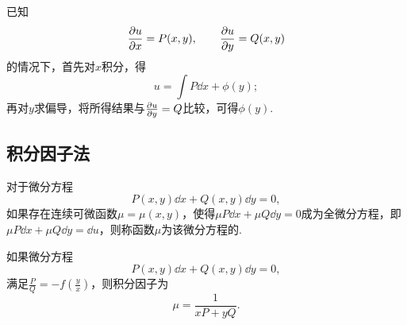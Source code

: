已知\[
\pdv{u}{x} = P(x,y),
\qquad
\pdv{u}{y} = Q(x,y)
\]的情况下，首先对\(x\)积分，得\[
u = \int P \dd{x} + \phi(y);
\]再对\(y\)求偏导，将所得结果与\(\pdv{u}{y} = Q\)比较，可得\(\phi(y)\).

\subsection{积分因子法}
对于微分方程\[
P(x,y)\dd{x} + Q(x,y)\dd{y} = 0,
\]如果存在连续可微函数\(\mu=\mu(x,y)\)，使得\(\mu P \dd{x} + \mu Q \dd{y} = 0\)成为全微分方程，即\(\mu P \dd{x} + \mu Q \dd{y} = \dd{u}\)，则称函数\(\mu\)为该微分方程的.

如果微分方程\[
P(x,y)\dd{x} + Q(x,y)\dd{y} = 0,
\]满足\(\frac{P}{Q}=-f\left(\frac{y}{x}\right)\)，则积分因子为\[
\mu = \frac{1}{xP+yQ}.
\]
